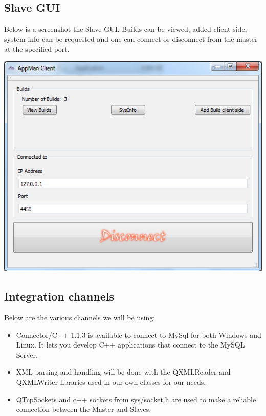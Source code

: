 \documentclass[a4paper,12pt,final]{article}
\begin{document}
 \subsection{Slave GUI}
Below is a screenshot the Slave GUI. Builds can be viewed, added client side, system info can be requested and one can connect or disconnect from the master at the specified port.
\begin{center}
  	\includegraphics[scale=0.6]{AppManClientGui.png}
  \end{center} 
\subsection{Integration channels}
Below are the various channels we will be using:
\begin{itemize}
\item Connector/C++ 1.1.3 is available to connect to MySql for both Windows and Linux. It lets you develop C++ applications that connect to the MySQL Server.
\item XML parsing and handling will be done with the QXMLReader and QXMLWriter libraries used in our own classes for our needs.
\item QTcpSockets and c++ sockets from sys/socket.h are used to make a reliable connection between the Master and Slaves.
\end{itemize}
\newpage
\end{document}
